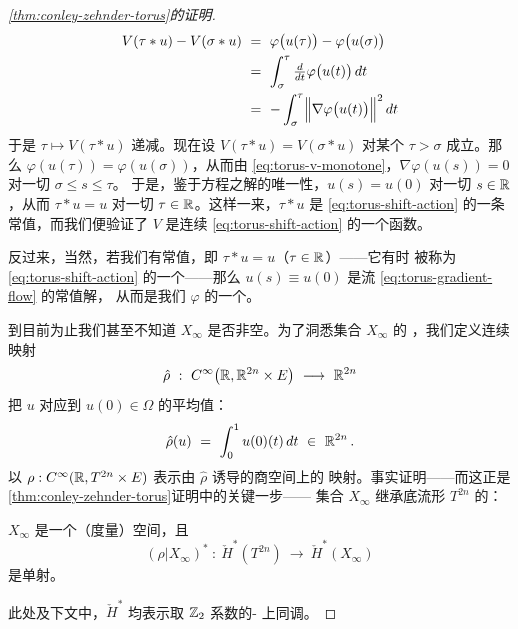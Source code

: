 \begin{proof}[\cref*{thm:conley-zehnder-torus}的证明]
\begin{equation}
\begin{aligned}
V(\tau*u)-V(\sigma*u)\ &=\ \varphi\bigl(u(\tau)\bigr)-\varphi\bigl(u(\sigma)\bigr)\\
&=\ \int_{\sigma}^{\tau}\tfrac{d}{dt}\varphi\bigl(u(t)\bigr)\,dt\\
&=\ -\int_{\sigma}^{\tau}\Bigl\|\nabla\varphi\bigl(u(t)\bigr)\Bigr\|^{2}\,dt
\end{aligned}
\end{equation}
于是 $\tau\mapsto V(\tau*u)$ \trMonotone{}递减。现在设 $V(\tau*u)=V(\sigma*u)$%
对某个 $\tau>\sigma$ 成立。那么 $\varphi(u(\tau))=\varphi(u(\sigma))$，从而由%
\eqref{eq:torus-v-monotone}，$\nabla\varphi(u(s))=0$ 对一切 $\sigma\leq s\leq\tau$。%
于是，鉴于\trGradient{}方程之解的唯一性，$u(s)=u(0)$ 对一切 $s\in\mathbb{R}$，从而%
$\tau*u=u$ 对一切 $\tau\in\mathbb{R}$。这样一来，$\tau*u$ 是\trFlow{}%
\eqref{eq:torus-shift-action} 的一条常值\trOrbit，而我们便验证了 $V$ 是连续%
\trFlow{} \eqref{eq:torus-shift-action} 的一个\trLyapunov{}函数。

反过来，当然，若我们有常值\trOrbit，即 $\tau*u=u$（$\tau\in\mathbb{R}$）——它有时%
被称为\trFlow{} \eqref{eq:torus-shift-action} 的一个\trRestPoint——那么%
$u(s)\equiv u(0)$ 是\trGradient{}流 \eqref{eq:torus-gradient-flow} 的常值解，%
从而是我们\trFunctional{} $\varphi$ 的一个\trCriticalPoint。

到目前为止我们甚至不知道 $X_{\infty}$ 是否非空。为了洞悉集合 $X_{\infty}$ 的%
\trTopology，我们定义连续映射
\begin{equation}\label{eq:torus-mean-map}
\hat{\rho}\ :\ C^{\infty}\bigl(\R,\R^{2n}\times E\bigr)\ \longrightarrow\ \R^{2n}
\end{equation}
把 $u$ 对应到\trLoop{} $u(0)\in\widehat{\Omega}$ 的平均值：
\[
\hat{\rho}(u)\ =\ \int_{0}^{1}u(0)(t)\,dt\ \in\ \R^{2n}\,.
\]
以 $\rho:C^{\infty}(\mathbb{R},T^{2n}\times E)$ 表示由 $\hat{\rho}$ 诱导的商空间上的%
映射。事实证明——而这正是\cref{thm:conley-zehnder-torus}证明中的关键一步——%
集合 $X_{\infty}$ 继承底流形 $T^{2n}$ 的\trTopology：

\begin{theorem}\label{thm:torus-cohomology-injective}
$X_{\infty}$ 是一个\trCompact{}（度量）空间，且
\begin{equation}\label{eq:torus-cohom-injective}
(\rho|X_{\infty})^{*}\ :\ \check{H}^{*}(T^{2n})\ \longrightarrow\ \check{H}^{*}(X_{\infty})
\end{equation}
是单射。
\end{theorem}

此处及下文中，$\check{H}^{*}$ 均表示取 $\mathbb{Z}_{2}$ 系数的\trAlexander-\trSpanier{}%
上同调。


\end{proof}
